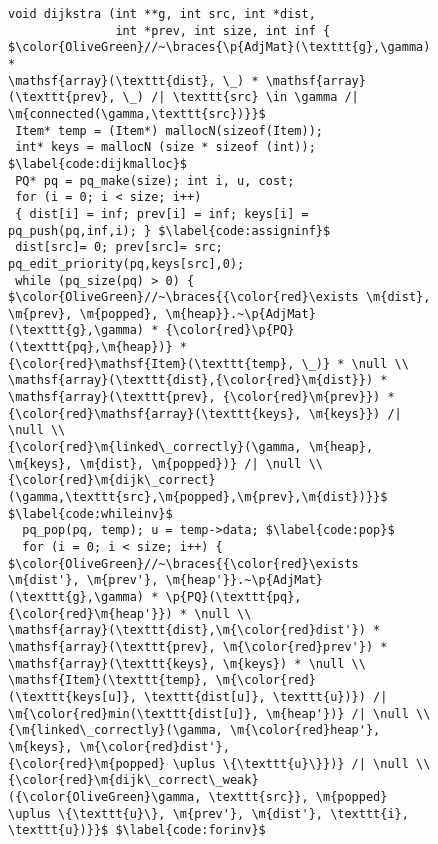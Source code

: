 
\begin{figure}[t]

\begin{lstlisting}[mathescape=true,showlines=true]
void dijkstra (int **g, int src, int *dist,
               int *prev, int size, int inf {
$\color{OliveGreen}//~\braces{\p{AdjMat}(\texttt{g},\gamma) *
\mathsf{array}(\texttt{dist}, \_) * \mathsf{array}(\texttt{prev}, \_) /| \texttt{src} \in \gamma /| \m{connected(\gamma,\texttt{src})}}$
 Item* temp = (Item*) mallocN(sizeof(Item));
 int* keys = mallocN (size * sizeof (int)); $\label{code:dijkmalloc}$
 PQ* pq = pq_make(size); int i, u, cost;
 for (i = 0; i < size; i++)
 { dist[i] = inf; prev[i] = inf; keys[i] = pq_push(pq,inf,i); } $\label{code:assigninf}$
 dist[src]= 0; prev[src]= src; pq_edit_priority(pq,keys[src],0);
 while (pq_size(pq) > 0) {
$\color{OliveGreen}//~\braces{{\color{red}\exists \m{dist}, \m{prev}, \m{popped}, \m{heap}}.~\p{AdjMat}(\texttt{g},\gamma) * {\color{red}\p{PQ}(\texttt{pq},\m{heap})} *
{\color{red}\mathsf{Item}(\texttt{temp}, \_)} * \null \\
\mathsf{array}(\texttt{dist},{\color{red}\m{dist}}) *
\mathsf{array}(\texttt{prev}, {\color{red}\m{prev}}) *
{\color{red}\mathsf{array}(\texttt{keys}, \m{keys}}) /| \null \\
{\color{red}\m{linked\_correctly}(\gamma, \m{heap}, \m{keys}, \m{dist}, \m{popped})} /| \null \\
{\color{red}\m{dijk\_correct}(\gamma,\texttt{src},\m{popped},\m{prev},\m{dist})}}$ $\label{code:whileinv}$
  pq_pop(pq, temp); u = temp->data; $\label{code:pop}$
  for (i = 0; i < size; i++) {
$\color{OliveGreen}//~\braces{{\color{red}\exists \m{dist'}, \m{prev'}, \m{heap'}}.~\p{AdjMat}(\texttt{g},\gamma) * \p{PQ}(\texttt{pq},{\color{red}\m{heap'}}) * \null \\
\mathsf{array}(\texttt{dist},\m{\color{red}dist'}) *
\mathsf{array}(\texttt{prev}, \m{\color{red}prev'}) *
\mathsf{array}(\texttt{keys}, \m{keys}) * \null \\
\mathsf{Item}(\texttt{temp}, \m{\color{red}(\texttt{keys[u]}, \texttt{dist[u]}, \texttt{u})}) /|
\m{\color{red}min(\texttt{dist[u]}, \m{heap'})} /| \null \\
{\m{linked\_correctly}(\gamma, \m{\color{red}heap'}, \m{keys}, \m{\color{red}dist'},
{\color{red}\m{popped} \uplus \{\texttt{u}\}})} /| \null \\
{\color{red}\m{dijk\_correct\_weak}({\color{OliveGreen}\gamma, \texttt{src}}, \m{popped} \uplus \{\texttt{u}\}, \m{prev'}, \m{dist'}, \texttt{i}, \texttt{u})}}$ $\label{code:forinv}$

\end{lstlisting}
\end{figure}

